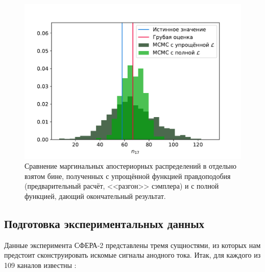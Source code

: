 \documentclass[12pt]{book}
\begin{document}
	\begin{figure}
		\centering
		\includegraphics[width=\columnwidth]{simplified-and-true-likelihood-comparison}
		\caption{Сравнение маргинальных апостериорных распределений в отдельно взятом бине, полученных с упрощённой функцией правдоподобия (предварительный расчёт, <<разгон>> сэмплера) и с полной функцией, дающий окончательный результат.}
		\label{pic:simplified-and-true-likelihood-comparison}
	\end{figure}


	\subsection{Подготовка экспериментальных данных}
	
	Данные эксперимента СФЕРА-2 представлены тремя сущностями, из которых нам предстоит сконструировать искомые сигналы анодного тока. Итак, для каждого из 109 каналов известны \cite{SphereDetector2020}:
	
\end{document}
